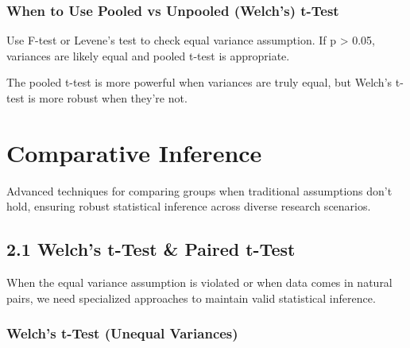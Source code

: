 \documentclass[
  11pt,
  letterpaper,
  oneside]{book}
\begin{document}
\subsection{When to Use Pooled vs Unpooled (Welch's)
t-Test}\label{when-to-use-pooled-vs-unpooled-welchs-t-test}

\begin{tcolorbox}[enhanced jigsaw, left=2mm, title=\textcolor{quarto-callout-warning-color}{\faExclamationTriangle}\hspace{0.5em}{Testing Equal Variances}, toprule=.15mm, toptitle=1mm, arc=.35mm, colframe=quarto-callout-warning-color-frame, breakable, coltitle=black, bottomtitle=1mm, bottomrule=.15mm, titlerule=0mm, opacitybacktitle=0.6, colback=white, leftrule=.75mm, rightrule=.15mm, opacityback=0, colbacktitle=quarto-callout-warning-color!10!white]

Use F-test or Levene's test to check equal variance assumption. If p
\textgreater{} 0.05, variances are likely equal and pooled t-test is
appropriate.

\end{tcolorbox}

The pooled t-test is more powerful when variances are truly equal, but
Welch's t-test is more robust when they're not.


\chapter{Comparative Inference}\label{comparative-inference}

Advanced techniques for comparing groups when traditional assumptions
don't hold, ensuring robust statistical inference across diverse
research scenarios.

\section{2.1 Welch's t-Test \& Paired
t-Test}\label{welchs-t-test-paired-t-test}

When the equal variance assumption is violated or when data comes in
natural pairs, we need specialized approaches to maintain valid
statistical inference.

\subsection{Welch's t-Test (Unequal
Variances)}\label{welchs-t-test-unequal-variances}
\end{document}
